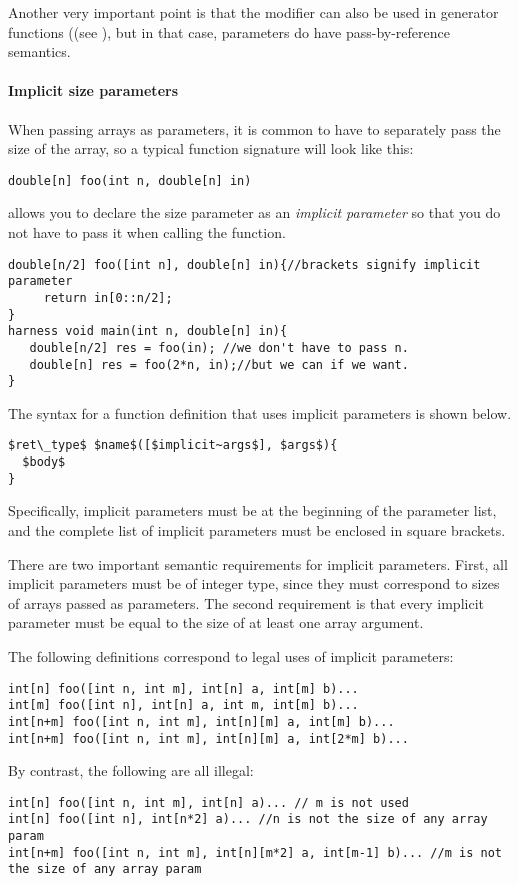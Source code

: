 Another very important point is that the  modifier can also be used in generator functions ((see ), but in that case,  parameters do have pass-by-reference semantics.


\paragraph{Implicit size parameters}

When passing arrays as parameters, it is common to have to separately pass the size of the array, so a typical function signature will look like this:
\begin{lstlisting}
double[n] foo(int n, double[n] in)
\end{lstlisting}

\Sk{} allows you to declare the size parameter  as an \emph{implicit parameter} so that you do not have to pass it when calling the function.

\begin{lstlisting}
double[n/2] foo([int n], double[n] in){//brackets signify implicit parameter
     return in[0::n/2];
}
harness void main(int n, double[n] in){
   double[n/2] res = foo(in); //we don't have to pass n.
   double[n] res = foo(2*n, in);//but we can if we want.
}
\end{lstlisting}

The syntax for a function definition that uses implicit parameters is shown below.
\begin{lstlisting}
$ret\_type$ $name$([$implicit~args$], $args$){
  $body$
}
\end{lstlisting}
Specifically, implicit parameters must be at the beginning of the parameter list, and the complete list of implicit parameters must be enclosed in square brackets.

There are two important semantic requirements for implicit parameters. First, all implicit parameters must be of integer type, since they must correspond to sizes of arrays passed as parameters. The second requirement is that every implicit parameter must be equal to the size of at least one array argument.

\begin{Example}
The following definitions correspond to legal uses of implicit parameters:
\begin{lstlisting}
int[n] foo([int n, int m], int[n] a, int[m] b)...
int[m] foo([int n], int[n] a, int m, int[m] b)...
int[n+m] foo([int n, int m], int[n][m] a, int[m] b)...
int[n+m] foo([int n, int m], int[n][m] a, int[2*m] b)...
\end{lstlisting}
By contrast, the following are all illegal:
\begin{lstlisting}
int[n] foo([int n, int m], int[n] a)... // m is not used
int[n] foo([int n], int[n*2] a)... //n is not the size of any array param
int[n+m] foo([int n, int m], int[n][m*2] a, int[m-1] b)... //m is not the size of any array param
\end{lstlisting}
\end{Example}

